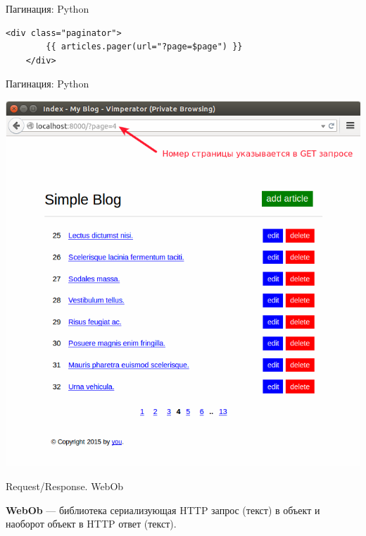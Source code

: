 \begin{frame}[fragile]{Пагинация: Python}

  \begin{lstlisting}[style=python]
    <div class="paginator">
        {{ articles.pager(url="?page=$page") }}
    </div>
  \end{lstlisting}

\end{frame}


\begin{frame}{Пагинация: Python}

  \begin{center}
    \includegraphics[height=\textheight]{media/blog_with_page.png}
  \end{center}

\end{frame}

\begin{frame}{Request/Response. WebOb}

  \textbf{WebOb} --- библиотека сериализующая HTTP запрос (текст) в объект и
  наоборот объект в HTTP ответ (текст).

\end{frame}



